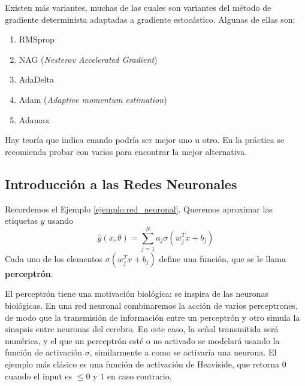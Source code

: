 \documentclass[letterpaper,11pt]{article} %
\theoremstyle{defbreak}
\theoremstyle{propbreak}
\theoremstyle{remark}
\theoremstyle{break}
\begin{document}
Existen más variantes, muchas de las cuales son variantes del método de gradiente determinista adaptadas a gradiente estocástico. Algunas de ellas son:
\begin{enumerate}
    \item RMSprop
    \item NAG (\textit{Nesterov Accelerated Gradient})
    \item AdaDelta
    \item Adam (\textit{Adaptive momentum estimation})
    \item Adamax
\end{enumerate}
Hay teoría que indica cuando podría ser mejor uno u otro. En la práctica se recomienda probar con varios para encontrar la mejor alternativa.

\subsection{Introducción a las Redes Neuronales}
Recordemos el Ejemplo \ref{ejemplo:red_neuronal}. Queremos aproximar las etiquetas $y$ usando
$$ \hat{y}(x,\theta) = \displaystyle \sum^N_{j=1}a_j\sigma(w_j^Tx+b_j) $$
Cada uno de los elementos $\sigma(w_j^Tx+b_j)$ define una función, que se le llama \textbf{perceptrón}. 

\newp El perceptrón tiene una motivación biológica: se inspira de las neuronas biológicas. En una red neuronal combinaremos la acción de varios perceptrones, de modo que la transmisión de información entre un perceptrón y otro simula la sinapsis entre neuronas del cerebro. En este caso, la señal transmitida será numérica, y el que un perceptrón esté o no activado se modelará usando la función de activación $\sigma$, similarmente a como se activaría una neurona. El ejemplo más clásico es una función de activación de Heaviside, que retorna $0$ cuando el input es $\leq 0$ y $1$ en caso contrario.
\end{document}

